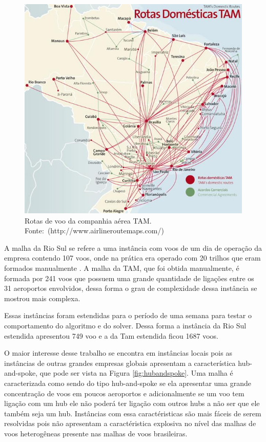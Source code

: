 \begin{figure}[ht]
\caption{Rotas de voo da companhia aérea TAM. \mbox{Fonte:
(http://www.airlineroutemaps.com/)}}
\label{fig:malhatam}
\includegraphics[scale=0.45]{./img/tam_brazilian_airlines}
\end{figure}
	
A malha da Rio Sul se refere a uma instância com voos de um dia de operação da
empresa contendo 107 voos, onde na prática era operado com 20 trilhos
que eram formados manualmente \cite{pontes2002}. A malha da TAM, que foi obtida
manualmente, é formada por 241 voos que possuem uma grande quantidade de
ligações entre os 31 aeroportos envolvidos, dessa forma o grau de complexidade
dessa instância se mostrou mais complexa. 

Essas instâncias foram estendidas para o período de uma semana para testar o
comportamento do algoritmo e do solver. Dessa forma a instância da Rio Sul
estendida apresentou 749 voo e a da Tam estendida ficou 1687 voos.
	
O maior interesse desse trabalho se encontra em instâncias locais
pois as instâncias de outras grandes empresas globais apresentam a
característica hub-and-spoke, que pode ser vista na Figura
\ref{fig:hubandspoke}. Uma malha é caracterizada como sendo do
tipo hub-and-spoke se ela apresentar uma grande concentração de voos em poucos
aeroportos e adicionalmente se um voo tem ligação com um hub ele não poderá ter
ligação com outros hubs a não ser que ele também seja um hub.
Instâncias com essa caractéristicas são mais fáceis de serem
resolvidas pois não apresentam a caractéristica explosiva no nível das malhas
de voos heterogêneas presente nas malhas de voos brasileiras.
	
